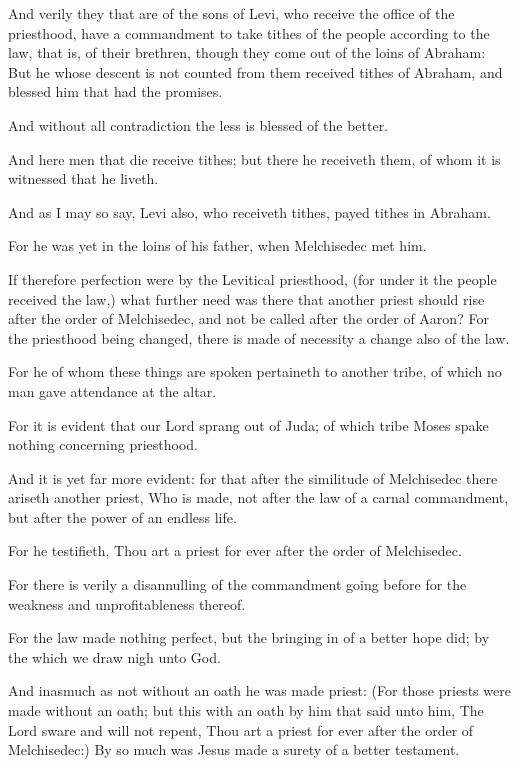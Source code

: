 \Verse And verily they that are of the sons of Levi, who receive the office of the priesthood, have a commandment to take tithes of the people according to the law, that is, of their brethren, though they come out of the loins of Abraham: \Verse But he whose descent is not counted from them received tithes of Abraham, and blessed him that had the promises.

\Verse And without all contradiction the less is blessed of the better.

\Verse And here men that die receive tithes; but there he receiveth them, of whom it is witnessed that he liveth.

\Verse And as I may so say, Levi also, who receiveth tithes, payed tithes in Abraham.

\Verse For he was yet in the loins of his father, when Melchisedec met him.

\Verse If therefore perfection were by the Levitical priesthood, (for under it the people received the law,) what further need was there that another priest should rise after the order of Melchisedec, and not be called after the order of Aaron?  \Verse For the priesthood being changed, there is made of necessity a change also of the law.

\Verse For he of whom these things are spoken pertaineth to another tribe, of which no man gave attendance at the altar.

\Verse For it is evident that our Lord sprang out of Juda; of which tribe Moses spake nothing concerning priesthood.

\Verse And it is yet far more evident: for that after the similitude of Melchisedec there ariseth another priest, \Verse Who is made, not after the law of a carnal commandment, but after the power of an endless life.

\Verse For he testifieth, Thou art a priest for ever after the order of Melchisedec.

\Verse For there is verily a disannulling of the commandment going before for the weakness and unprofitableness thereof.

\Verse For the law made nothing perfect, but the bringing in of a better hope did; by the which we draw nigh unto God.

\Verse And inasmuch as not without an oath he was made priest: \Verse (For those priests were made without an oath; but this with an oath by him that said unto him, The Lord sware and will not repent, Thou art a priest for ever after the order of Melchisedec:) \Verse By so much was Jesus made a surety of a better testament.


